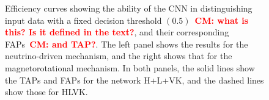 \documentclass[aps,twocolumn,showpacs,groupedaddress, nofootinbib]{revtex4}  %
\newcommand{\cm}[1]{\textbf{\textcolor{red}{CM: #1}}}
\begin{document}
%
%
\begin{figure}
     \begin{center}
        \quad
    \end{center}
    \caption{Efficiency curves showing the ability of the \ac{CNN} in
distinguishing input data with a fixed decision threshold $(0.5)$~\cm{what is
this? Is it defined in the text?}, and their corresponding \acp{FAP}~\cm{and
TAP?}. The left panel shows the results for the neutrino-driven mechanism, and
the right shows that for the magnetorotational mechanism. In both panels, the
solid lines show the \acp{TAP} and \acp{FAP} for the network H+L+VK, and the
dashed lines show those for HLVK.\label{fig:ROCfixed}}
\end{figure}
\end{document}
